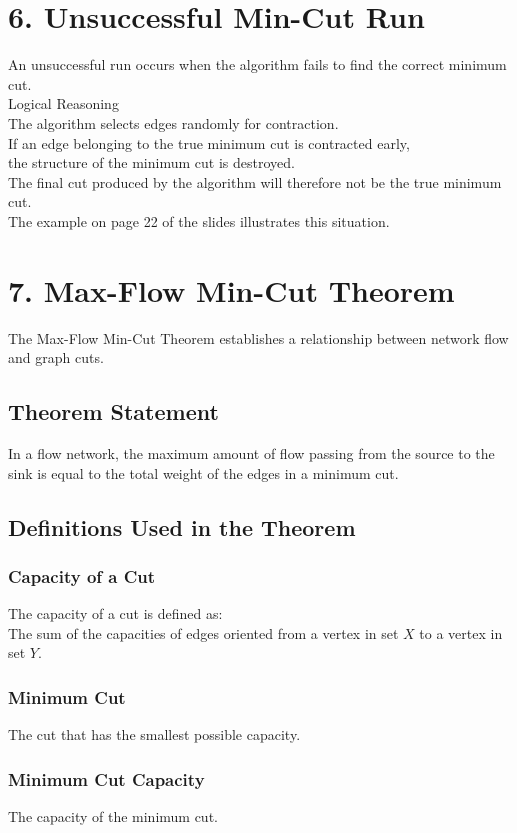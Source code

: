 \documentclass{article}
\begin{document}
\section{6. Unsuccessful Min-Cut Run}
An unsuccessful run occurs when the algorithm fails to find the correct minimum cut. \\
Logical Reasoning \\
The algorithm selects edges randomly for contraction. \\
If an edge belonging to the true minimum cut is contracted early, \\
the structure of the minimum cut is destroyed. \\
The final cut produced by the algorithm will therefore not be the true minimum cut. \\
The example on page 22 of the slides illustrates this situation.

\section{7. Max-Flow Min-Cut Theorem}
The Max-Flow Min-Cut Theorem establishes a relationship between network flow and graph cuts.

\subsection{Theorem Statement}
In a flow network, the maximum amount of flow passing from the source to the sink is equal to the total weight of the edges in a minimum cut.

\subsection{Definitions Used in the Theorem}

\subsubsection{Capacity of a Cut}
The capacity of a cut is defined as: \\
The sum of the capacities of edges oriented from a vertex in set $X$ to a vertex in set $Y$.

\subsubsection{Minimum Cut}
The cut that has the smallest possible capacity.

\subsubsection{Minimum Cut Capacity}
The capacity of the minimum cut.
\end{document}
